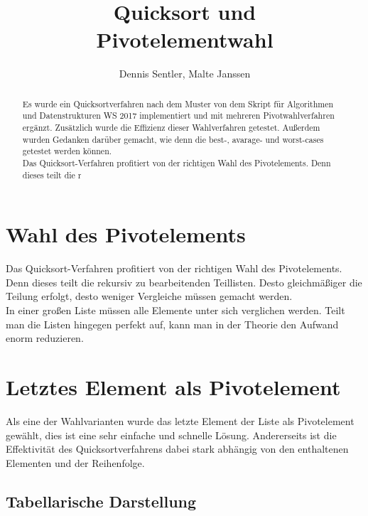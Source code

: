\documentclass[12pt]{article}
\begin{document}
 
 
\title{Quicksort und\\Pivotelementwahl}
\author{Dennis Sentler, Malte Janssen}
\maketitle

\begin{abstract}
Es wurde ein Quicksortverfahren nach dem Muster von dem Skript für Algorithmen und Datenstrukturen WS 2017 implementiert und mit mehreren Pivotwahlverfahren ergänzt. Zusätzlich wurde die Effizienz dieser Wahlverfahren getestet. Außerdem wurden Gedanken darüber gemacht, wie denn die best-, avarage- und worst-cases getestet werden können.\\
Das Quicksort-Verfahren profitiert von der richtigen Wahl des Pivotelements. Denn dieses teilt die r
\end{abstract}

\section{Wahl des Pivotelements}
Das Quicksort-Verfahren profitiert von der richtigen Wahl des Pivotelements. Denn dieses teilt die rekursiv zu bearbeitenden Teillisten. Desto gleichmäßiger die Teilung erfolgt, desto weniger Vergleiche müssen gemacht werden.\\
In einer großen Liste müssen alle Elemente unter sich verglichen werden. Teilt man die Listen hingegen perfekt auf, kann man in der Theorie den Aufwand enorm reduzieren.
\newpage
\section{Letztes Element als Pivotelement}
Als eine der Wahlvarianten wurde das letzte Element der Liste als Pivotelement gewählt, dies ist eine sehr einfache und schnelle Lösung. Andererseits ist die Effektivität des Quicksortverfahrens dabei stark abhängig von den enthaltenen Elementen und der Reihenfolge.


\subsection{Tabellarische Darstellung}
\end{document}
